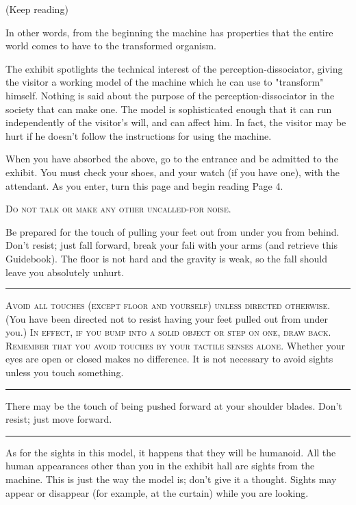 (Keep reading) 

\clearpage

In other words, from the beginning the machine has properties that the 
entire world comes to have to the transformed organism. 

The exhibit spotlights the technical interest of the 
perception-dissociator, giving the visitor a working model of the machine 
which he can use to "transform" himself. Nothing is said about the purpose 
of the perception-dissociator in the society that can make one. The model is 
sophisticated enough that it can run independently of the visitor's will, and 
can affect him. In fact, the visitor may be hurt if he doesn't follow the 
instructions for using the machine. 


When you have absorbed the above, go to the entrance and be admitted 
to the exhibit. You must check your shoes, and your watch (if you have 
one), with the attendant. As you enter, turn this page and begin reading Page 
4. 

\clearpage

\textsc{Do not talk or make any other uncalled-for noise.}


Be prepared for the touch of pulling your feet out from under you 
from behind. Don't resist; just fall forward, break your fali with your arms 
(and retrieve this Guidebook). The floor is not hard and the gravity is weak, 
so the fall should leave you absolutely unhurt. 

\plainbreak{2}

\textsc{Avoid all touches (except floor and yourself) unless directed otherwise.}
(You have been directed not to resist having your 
feet pulled out from under you.) 
\textsc{In effect, if you bump into a solid object or step on one, draw back. Remember
that you avoid touches by your tactile senses alone.}
Whether your eyes are open or closed makes no difference. It is not necessary to avoid 
sights unless you touch something. 

\plainbreak{2}

There may be the touch of being pushed forward at your shoulder 
blades. Don't resist; just move forward. 

\plainbreak{2}

As for the sights in this model, it happens that they will be humanoid. 
All the human appearances other than you in the exhibit hall are sights from 
the machine. This is just the way the model is; don't give it a thought. Sights 
may appear or disappear (for example, at the curtain) while you are looking. 

